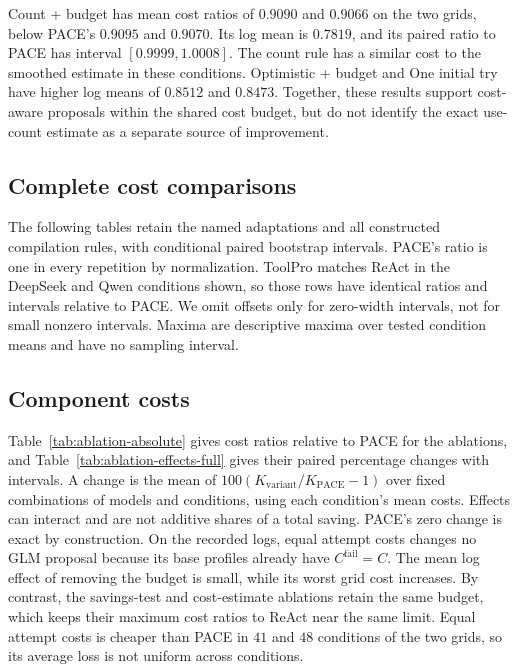 Count + budget has mean cost ratios of $0.9090$ and $0.9066$ on the two grids, below PACE's $0.9095$ and $0.9070$.
Its log mean is $0.7819$, and its paired ratio to PACE has interval $[0.9999,1.0008]$.
The count rule has a similar cost to the smoothed estimate in these conditions.
Optimistic + budget and One initial try have higher log means of $0.8512$ and $0.8473$.
Together, these results support cost-aware proposals within the shared cost budget, but do not identify the exact use-count estimate as a separate source of improvement.

\subsection{Complete cost comparisons}
\label{app:full-comparisons}
The following tables retain the named adaptations and all constructed compilation rules, with conditional paired bootstrap intervals.
PACE's ratio is one in every repetition by normalization.
ToolPro matches ReAct in the DeepSeek and Qwen conditions shown, so those rows have identical ratios and intervals relative to PACE.
We omit offsets only for zero-width intervals, not for small nonzero intervals.
Maxima are descriptive maxima over tested condition means and have no sampling interval.


\subsection{Component costs}
\label{app:ablation-absolute}
Table~\ref{tab:ablation-absolute} gives cost ratios relative to PACE for the ablations, and Table~\ref{tab:ablation-effects-full} gives their paired percentage changes with intervals.
A change is the mean of $100(K_{\mathrm{variant}}/K_{\mathrm{PACE}}-1)$ over fixed combinations of models and conditions, using each condition's mean costs.
Effects can interact and are not additive shares of a total saving.
PACE's zero change is exact by construction.
On the recorded logs, equal attempt costs changes no GLM proposal because its base profiles already have $C^{\mathrm{fail}}=C$.
The mean log effect of removing the budget is small, while its worst grid cost increases.
By contrast, the savings-test and cost-estimate ablations retain the same budget, which keeps their maximum cost ratios to ReAct near the same limit.
Equal attempt costs is cheaper than PACE in $41$ and $48$ conditions of the two grids, so its average loss is not uniform across conditions.


